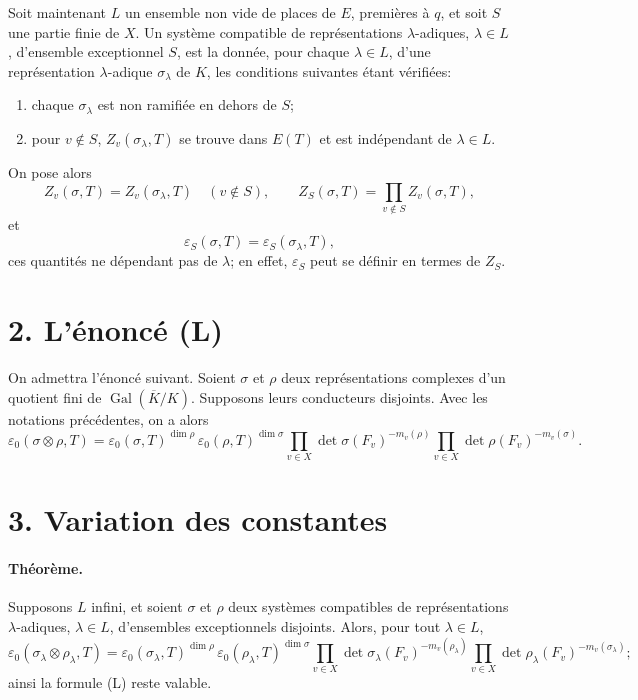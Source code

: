 \documentclass[11pt]{article}
\newcommand{\Gal}{\operatorname{Gal}}
\newcommand{\dimn}{\operatorname{dim}}
\newcommand{\eps}{\varepsilon}
\begin{document}
Soit maintenant $L$ un ensemble non vide de places de $E$, premières à $q$, et soit $S$ une partie finie de $X$. Un système compatible de représentations $\lambda$-adiques, $\lambda\in L$, d'ensemble exceptionnel $S$, est la donnée, pour chaque $\lambda\in L$, d'une représentation $\lambda$-adique $\sigma_\lambda$ de $K$, les conditions suivantes étant vérifiées:
\begin{enumerate}[label=(\roman*)]
\item chaque $\sigma_\lambda$ est non ramifiée en dehors de $S$;
\item pour $v\notin S$, $Z_v(\sigma_\lambda,T)$ se trouve dans $E(T)$ et est indépendant de $\lambda\in L$.
\end{enumerate}
On pose alors
\[
 Z_v(\sigma,T)=Z_v(\sigma_\lambda,T)\quad(v\notin S),
 \qquad
 Z_S(\sigma,T)=\prod_{v\notin S} Z_v(\sigma,T),
\]
et
\[
 \eps_S(\sigma,T)=\eps_S(\sigma_\lambda,T),
\]
ces quantités ne dépendant pas de $\lambda$; en effet, $\eps_S$ peut se définir en termes de $Z_S$.

\section*{2. L'énoncé (L)}

On admettra l'énoncé suivant. Soient $\sigma$ et $\rho$ deux représentations complexes d'un quotient fini de $\Gal(\overline K/K)$. Supposons leurs conducteurs disjoints. Avec les notations précédentes, on a alors
\begin{equation}\tag{L}
\eps_0(\sigma\otimes\rho,T)
=\eps_0(\sigma,T)^{\dimn\rho}\,
 \eps_0(\rho,T)^{\dimn\sigma}
 \prod_{v\in X}\det\sigma(F_v)^{-m_v(\rho)}
 \prod_{v\in X}\det\rho(F_v)^{-m_v(\sigma)}.
\end{equation}

\section*{3. Variation des constantes}

\paragraph{Théorème.} Supposons $L$ infini, et soient $\sigma$ et $\rho$ deux systèmes compatibles de représentations $\lambda$-adiques, $\lambda\in L$, d'ensembles exceptionnels disjoints. Alors, pour tout $\lambda\in L$,
\begin{equation}\tag{*}
\eps_0(\sigma_\lambda\otimes\rho_\lambda,T)
=\eps_0(\sigma_\lambda,T)^{\dimn\rho}\,
 \eps_0(\rho_\lambda,T)^{\dimn\sigma}
 \prod_{v\in X}\det\sigma_\lambda(F_v)^{-m_v(\rho_\lambda)}
 \prod_{v\in X}\det\rho_\lambda(F_v)^{-m_v(\sigma_\lambda)};
\end{equation}
ainsi la formule (L) reste valable.
\end{document}

